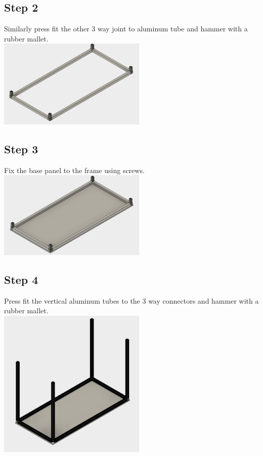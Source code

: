 \documentclass[a4paper,12pt,oneside]{book}
\begin{document}
\subsection*{Step 2}
Similarly press fit the other 3 way joint to aluminum tube and hammer with a rubber mallet.\\
\includegraphics[width=200pt]{2}
\subsection*{Step 3}
Fix the base panel to the frame using screws.\\
\includegraphics[width=200pt]{3}
\subsection*{Step 4}
Press fit the vertical aluminum tubes to the 3 way connectors and hammer with a rubber mallet.\\
\includegraphics[width=200pt]{4}
\end{document}
